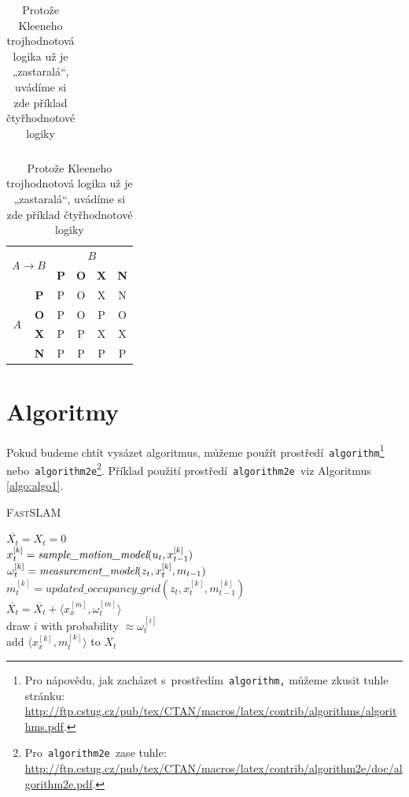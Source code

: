\documentclass[11pt, a4paper, titlepage]{article}
\begin{document}
\begin{table}[h]
\begin{tabular}{|c|c|c|c|c|c|}
\end{tabular}
\begin{tabular}{|c|c|c|c|c|c|}\hline
\multicolumn{2}{|c|}{\multirow{2}{*}{$A \rightarrow B$}} & \multicolumn{4}{c|}{$B$}\\ \cline{3-6}
\multicolumn{2}{|c|}{} & \textbf{P} & \textbf{O} & \textbf{X} & \textbf{N}\\ \cline{1-6}
\multirow{4}{*}{$A$} & \textbf{P} & P & O & X & N\\ \cline{2-6}
& \textbf{O} & P & O & P & O\\ \cline{2-6}
& \textbf{X} & P & P & X & X\\ \cline{2-6}
& \textbf{N} & P & P & P & P\\ \hline
\end{tabular} \caption{Protože Kleeneho trojhodnotová logika už je „zastaralá“, uvádíme si zde příklad čtyřhodnotové logiky}
\label{tab:tab2}
\end{table}
\bigskip
\pagebreak
\newpage

\section{Algoritmy}
\label{section:algo}
Pokud budeme chtít vysázet algoritmus, můžeme použít prostředí\verb| algorithm|\footnote{Pro nápovědu, jak zacházet s~prostředím\texttt{ algorithm,} můžeme zkusit tuhle stránku:\\ \url{http://ftp.cstug.cz/pub/tex/CTAN/macros/latex/contrib/algorithms/algorithms.pdf}.} 
\verb| |nebo\verb| algorithm2e|\footnote{Pro\texttt{ algorithm2e }zase tuhle: \url{http://ftp.cstug.cz/pub/tex/CTAN/macros/latex/contrib/algorithm2e/doc/algorithm2e.pdf}.}.
Příklad použití prostředí\verb| algorithm2e |viz Algoritmus \ref*{algo:algo1}.

\bigskip

\IncMargin{1.5em}
\begin{algorithm}
\label{algo:algo1}
\caption{\textsc{FastSLAM}}
\SetNlSty{}{}{:}
\SetNlSkip{0.5em}
\SetInd{0em}{1em}
\Indm\Indmm
{}
\Indpp\Indp
\SetInd{1em}{1em}
\BlankLine
$\overline{X_t} = X_t = 0$\\
{
$x_t^{[k]} = \emph{sample\_motion\_model}(u_t, x_{t - 1}^{[k]})$\\
$\omega_t^{[k]} = \emph{measurement\_model}(z_t, x_t^{[k]}, m_{t - 1})$\\
$m_t^{[k]} = updated\_occupancy\_grid(z_t, x_t^{[k]}, m_{t - 1}^{[k]})$\\
$\overline{X_t} = \overline{X_t} + \langle x_x^{[m]}, \omega_t^{[m]}  \rangle$\\
}
{
draw $i$ with probability $\approx \omega_t^{[i]}$\\
add $\langle x_x^{[k]}, m_t^{[k]} \rangle $ to $ X_t$\\
}
\end{algorithm}
\end{document}
